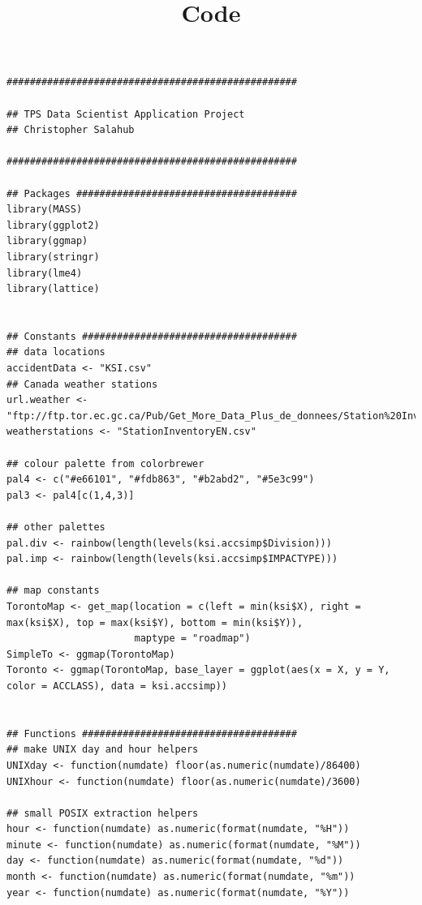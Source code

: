 \documentclass{article}
\begin{document}
\clearpage

\title{Code}
\begin{lstlisting}
##################################################

## TPS Data Scientist Application Project
## Christopher Salahub

##################################################

## Packages ######################################
library(MASS)
library(ggplot2)
library(ggmap)
library(stringr)
library(lme4)
library(lattice)


## Constants #####################################
## data locations
accidentData <- "KSI.csv"
## Canada weather stations
url.weather <- "ftp://ftp.tor.ec.gc.ca/Pub/Get_More_Data_Plus_de_donnees/Station%20Inventory%20EN.csv"
weatherstations <- "StationInventoryEN.csv"

## colour palette from colorbrewer
pal4 <- c("#e66101", "#fdb863", "#b2abd2", "#5e3c99")
pal3 <- pal4[c(1,4,3)]

## other palettes
pal.div <- rainbow(length(levels(ksi.accsimp$Division)))
pal.imp <- rainbow(length(levels(ksi.accsimp$IMPACTYPE)))

## map constants
TorontoMap <- get_map(location = c(left = min(ksi$X), right = max(ksi$X), top = max(ksi$Y), bottom = min(ksi$Y)),
                      maptype = "roadmap")
SimpleTo <- ggmap(TorontoMap)
Toronto <- ggmap(TorontoMap, base_layer = ggplot(aes(x = X, y = Y, color = ACCLASS), data = ksi.accsimp))


## Functions #####################################
## make UNIX day and hour helpers
UNIXday <- function(numdate) floor(as.numeric(numdate)/86400)
UNIXhour <- function(numdate) floor(as.numeric(numdate)/3600)

## small POSIX extraction helpers
hour <- function(numdate) as.numeric(format(numdate, "%H"))
minute <- function(numdate) as.numeric(format(numdate, "%M"))
day <- function(numdate) as.numeric(format(numdate, "%d"))
month <- function(numdate) as.numeric(format(numdate, "%m"))
year <- function(numdate) as.numeric(format(numdate, "%Y"))


\end{lstlisting}
\end{document}
